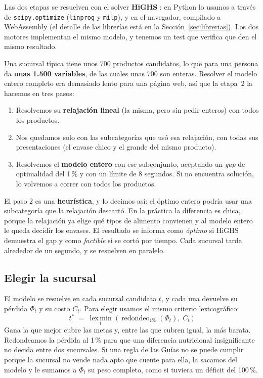 \documentclass[10pt,a4paper]{article}
\begin{document}
Las dos etapas se resuelven con el solver \textbf{HiGHS} \cite{highs}: en Python lo
usamos a través de \texttt{scipy.optimize} (\texttt{linprog} y \texttt{milp}), y en
el navegador, compilado a WebAssembly (el detalle de las librerías está en la
Sección~\ref{sec:librerias}). Los dos motores implementan el mismo modelo, y tenemos
un test que verifica que den el mismo resultado.

Una sucursal típica tiene unos 700 productos candidatos, lo que para una persona da
\textbf{unas 1.500 variables}, de las cuales unas 700 son enteras. Resolver el modelo
entero completo era demasiado lento para una página web, así que la etapa~2 la
hacemos en tres pasos:

\begin{enumerate}
  \item Resolvemos su \textbf{relajación lineal} (la misma, pero sin pedir enteros)
        con todos los productos.
  \item Nos quedamos solo con las subcategorías que usó esa relajación, con todas sus
        presentaciones (el envase chico y el grande del mismo producto).
  \item Resolvemos el \textbf{modelo entero} con ese subconjunto, aceptando un
        \emph{gap} de optimalidad del 1\,\% y con un límite de 8 segundos. Si no
        encuentra solución, lo volvemos a correr con todos los productos.
\end{enumerate}

El paso 2 es una \textbf{heurística}, y lo decimos así: el óptimo entero podría usar
una subcategoría que la relajación descartó. En la práctica la diferencia es chica,
porque la relajación ya elige qué tipos de alimento convienen y al modelo entero le
queda decidir los envases. El resultado se informa como \emph{óptimo} si HiGHS
demuestra el gap y como \emph{factible} si se cortó por tiempo. Cada sucursal tarda
alrededor de un segundo, y se resuelven en paralelo.

\subsection{Elegir la sucursal}
\label{sec:sucursal}

El modelo se resuelve en cada sucursal candidata $t$, y cada una devuelve su pérdida
$\Phi_t$ y su costo $C_t$. Para elegir usamos el mismo criterio lexicográfico:
\[
t^\ast \;=\; \operatorname*{lex\,min}_{t}\;\bigl(\,\operatorname{redondeo}_{1\%}(\Phi_t),\; C_t\,\bigr)
\]
Gana la que mejor cubre las metas y, entre las que cubren igual, la más barata.
Redondeamos la pérdida al 1\,\% para que una diferencia nutricional insignificante no
decida entre dos sucursales. Si una regla de las Guías no se puede cumplir porque la
sucursal no vende nada apto que cuente para ella, la sacamos del modelo y le sumamos
a $\Phi_t$ su peso completo, como si tuviera un déficit del 100\,\%.
\end{document}
